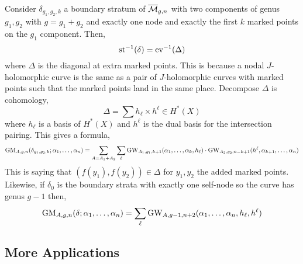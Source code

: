 \documentclass[12pt]{article}
\begin{document}
Consider $\delta_{g_1, g_2, k}$ a boundary stratum of $\overline{\mathcal{M}}_{g,n}$ with two components of genus $g_1, g_2$ with $g = g_1 + g_2$ and exactly one node and exactly the first $k$ marked points on the $g_1$ component. Then,
\[ \mathrm{st}^{-1}(\delta) = \mathrm{ev}^{-1}(\Delta) \]
where $\Delta$ is the diagonal at extra marked points. This is because a nodal $J$-holomorphic curve is the same as a pair of $J$-holomorphic curves with marked points such that the marked points land in the same place. Decompose $\Delta$ is cohomology,
\[ \Delta = \sum h_\ell \times h^\ell \in H^*(X) \]
where $h_\ell$ is a basis of $H^*(X)$ and $h^\ell$ is the dual basis for the intersection pairing. This gives a formula,
\[ \mathrm{GM}_{A,g,n}(\delta_{g_1, g_2, k} ; \alpha_1, \dots, \alpha_n) = \sum_{A = A_1 + A_2} \sum_\ell \mathrm{GW}_{A_1, g_1, k+1}(\alpha_1, \dots, \alpha_k, h_\ell) \cdot \mathrm{GW}_{A_2, g_2, n-k+1}(h^\ell, \alpha_{k+1}, \dots, \alpha_n) \]
This is saying that $(f(y_1), f(y_2)) \in \Delta$ for $y_1, y_2$ the added marked points. Likewise, if $\delta_0$ is the boundary strata with exactly one self-node so the curve has genus $g-1$ then,
\[ \mathrm{GM}_{A,g,n}(\delta; \alpha_1, \dots, \alpha_n) = \sum_{\ell} \mathrm{GW}_{A,g-1,n+2}(\alpha_1, \dots, \alpha_n, h_\ell, h^\ell) \]

\subsection{More Applications}
\end{document}
